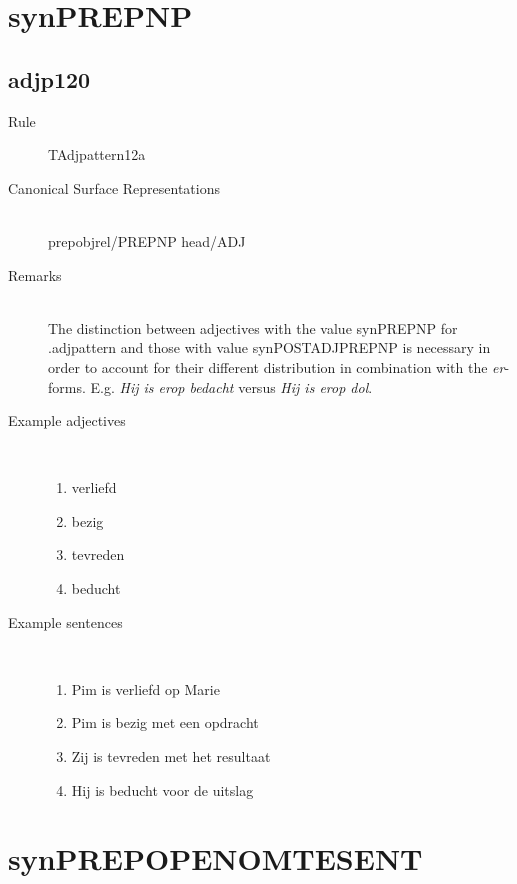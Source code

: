 \section{synPREPNP}
  \subsection{adjp120}
\begin{description}
  \item [Rule] TAdjpattern12a
  \item [Canonical Surface Representations] \mbox{}\\
prepobjrel/PREPNP head/ADJ
  \item [Remarks]  \mbox{}\\ The distinction between adjectives with the value 
synPREPNP  for .adjpattern and those with value synPOSTADJPREPNP is necessary
in order to account for their different distribution in combination with 
the {\em er}-forms. E.g. {\em Hij is erop bedacht} versus 
{\em *Hij is erop dol}.
  \item [Example adjectives] \mbox{}\\
\begin{enumerate}
  \item verliefd
  \item bezig
  \item tevreden
  \item beducht
\end{enumerate}
  \item [Example sentences]\mbox{}\\
\begin{enumerate}
  \item Pim is verliefd op Marie
  \item Pim is bezig met een opdracht
  \item Zij is tevreden met het resultaat
  \item Hij is beducht voor de uitslag
\end{enumerate}
\end{description}
\newpage
\section{synPREPOPENOMTESENT}
